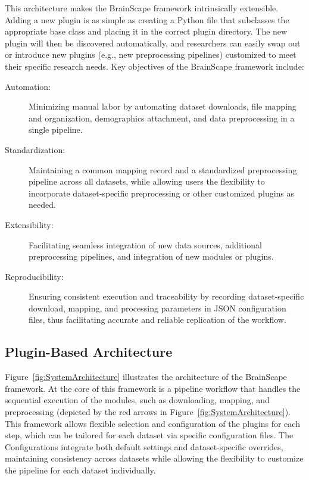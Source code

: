 This architecture makes the BrainScape framework intrinsically extensible. Adding a new plugin
is as simple as creating a Python file that subclasses the appropriate base class 
and placing it in the correct plugin directory. 
The new plugin will then be discovered automatically, and 
researchers can easily swap out or introduce new plugins (e.g., new preprocessing pipelines) 
customized to meet their specific research needs.
Key objectives of the BrainScape framework include: 
\begin{description}
    \item[Automation:] Minimizing manual labor by automating dataset downloads, file mapping and organization, demographics attachment, and data preprocessing in a single pipeline.
    \item[Standardization:] Maintaining a common mapping record and a standardized preprocessing pipeline across all datasets, while allowing users the flexibility to incorporate dataset-specific preprocessing or other customized plugins as needed.
    \item[Extensibility:] Facilitating seamless integration of new data sources, additional preprocessing pipelines, and integration of new modules or plugins. 
    \item[Reproducibility:] Ensuring consistent execution and traceability by recording dataset-specific download, mapping, and processing parameters in JSON configuration files, thus facilitating accurate and reliable replication of the workflow.
\end{description}


\subsection{Plugin-Based Architecture}

Figure~\ref{fig:SystemArchitecture} illustrates the architecture of the BrainScape framework. 
At the core of this framework is a pipeline workflow that handles the sequential execution of the modules, 
such as downloading, mapping, and preprocessing (depicted by the red arrows in Figure~\ref{fig:SystemArchitecture}). 
This framework allows flexible selection and configuration of the plugins for each step, which can be tailored for 
each dataset via specific configuration files.
The Configurations integrate both default settings and dataset-specific overrides, maintaining consistency 
across datasets while allowing the flexibility to customize the pipeline for each dataset individually.

